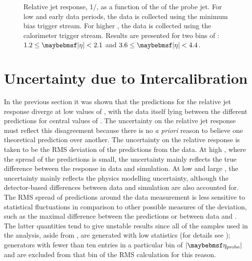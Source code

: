 \begin{figure}[htpb]
{    \label{fig:etaint:relative_jet_response_vs_pt_eta3.6_4.4}}
  \caption{Relative jet response, 1/\relResponse, as a function of the \pseudorap of the probe jet.
           For low \pTavg and early data periods, the data is collected using the minimum bias trigger stream. For
           higher \pTavg, the data is collected using the calorimeter trigger stream.
           Results are presented for two bins of \absEta: \protect{}
           $1.2 \leq \absEta < 2.1$ and \protect{}
           $3.6 \leq \absEta < 4.4$.}
  \label{fig:etaint:relative_jet_response_vs_pt}
\end{figure}


\section{Uncertainty due to Intercalibration}
In the previous section it was shown that the \MC predictions for the relative
jet response diverge at low values of \pTavg, with the data itself lying between
the different predictions for central values of \pseudorap. The uncertainty on
the relative jet response must reflect this disagreement because there is no \textit{a priori} reason to
believe one theoretical prediction over another. The uncertainty on the relative
response is taken to be the RMS deviation of the \MC predictions from the data.
At high \pTavg, where the spread of the \MC predictions is small, the
uncertainty mainly reflects the true difference between the response in data and
simulation. At low \pTavg and large \absEta, the uncertainty mainly reflects the
physics modelling uncertainty, although the detector-based differences between
data and simulation are also accounted for. The RMS spread of \MC predictions
around the data measurement is less sensitive to statistical fluctuations in
comparison to other possible measures of the deviation, such as the maximal
difference between the predictions or between data and \MC. The latter
quantities tend to give unstable results since all of the \MC samples used
in the analysis, aside from \Pythia, are generated with low statistics (for details see
); \MC generators with fewer than ten
entries in a particular bin of $|\etaProbe|$ and \pTavg are excluded from that bin
of the RMS calculation for this reason.

